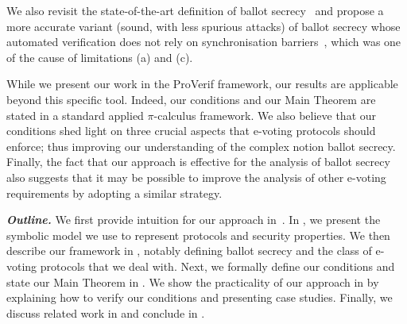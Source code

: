   We also revisit the state-of-the-art definition of ballot secrecy~\cite{KremerRyan2005,DKR-jcs09}
and propose a more accurate variant (\ie sound, with less spurious attacks) of ballot secrecy whose automated verification
does not rely on synchronisation barriers~\cite{KremerRyan2005,DKR-jcs09,vote-CSF16,dreier2017beyond,vote-ifip},
which was one of the cause of limitations (a) and (c).

While we present our work in the ProVerif framework, our results
are applicable beyond this specific tool. %
Indeed, our conditions and our Main Theorem are stated in a standard applied $\pi$-calculus framework.
We also believe that our conditions shed light on three crucial aspects that
e-voting protocols should enforce; thus improving our understanding of the complex notion
ballot secrecy.
Finally, the fact that our approach is effective for the analysis of
ballot secrecy also suggests that it may be possible to improve the analysis of other e-voting
requirements by adopting a similar strategy.
%
%


\noindent
\textbf{\em Outline.}
We first provide intuition for our approach in~.
In , we present the symbolic model we use to represent
protocols and security properties.
We then describe our framework in , notably defining
ballot secrecy and the class
of e-voting protocols that we deal with.
Next, we formally define our conditions and state our Main Theorem in .
We show the practicality of our approach in  by explaining how to verify
our conditions and presenting case studies.
Finally, we discuss related work in  and conclude
in .


